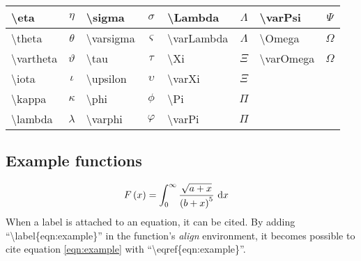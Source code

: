\begin{center}
\begin{tabular}{|l|c||l|c|l|c||l|c|}
\textbackslash eta          & $\eta$            & \textbackslash sigma        & $\sigma$    & \textbackslash Lambda       & $\Lambda$       & \textbackslash varPsi       & $\varPsi$       \\ \hline
\textbackslash theta        & $\theta$          & \textbackslash varsigma     & $\varsigma$ & \textbackslash varLambda    & $\varLambda$    & \textbackslash Omega        & $\Omega$        \\ \hline
\textbackslash vartheta     & $\vartheta$       & \textbackslash tau          & $\tau$      & \textbackslash Xi           & $\Xi$           & \textbackslash varOmega     & $\varOmega$     \\ \hline
\textbackslash iota         & $\iota$           & \textbackslash upsilon      & $\upsilon$  & \textbackslash varXi        & $\varXi$        &                             &                 \\ \hline
\textbackslash kappa        & $\kappa$          & \textbackslash phi          & $\phi$      & \textbackslash Pi           & $\Pi$           &                             &                 \\ \hline
\textbackslash lambda       & $\lambda$         & \textbackslash varphi       & $\varphi$   & \textbackslash varPi        & $\varPi$        &                             &                 \\ \hline
\end{tabular}
\end{center}


\subsection{Example functions}
\begin{align}
F\left( x \right) & = \int_{0}^{\infty} \frac{\sqrt{a + x}}{\left( b + x \right)^5}~\textrm{d}x
\label{eqn:example}
\end{align}
When a label is attached to an equation, it can be cited. By adding ``\textbackslash label\{eqn:example\}'' in
the function's \textit{align} environment, it becomes possible to cite equation \eqref{eqn:example} with
``\textbackslash eqref\{eqn:example\}''.



